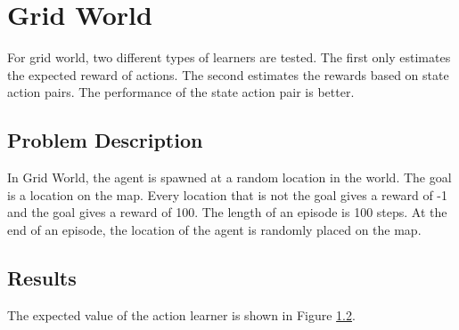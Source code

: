
\section{Grid World}
For grid world, two different types of learners are tested.  The first only estimates the expected reward of actions.  The second estimates the rewards based on state action pairs.  The performance of the state action pair is better.

\subsection{Problem Description}
In Grid World, the agent is spawned at a random location in the world.  The goal is a location on the map.  Every location that is not the goal gives a reward of -1 and the goal gives a reward of 100.  The length of an episode is 100 steps.  At the end of an episode, the location of the agent is randomly placed on the map.

\subsection{Results}
The expected value of the action learner is shown in Figure \ref{}.  



